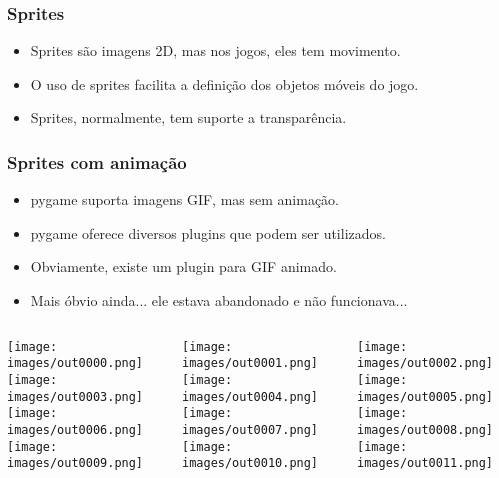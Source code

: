 
\begin{frame}
    \frametitle{Sprites}

    \begin{itemize}
        \item Sprites são imagens 2D, mas nos jogos, eles tem movimento.
        \item O uso de sprites facilita a definição dos objetos móveis
        do jogo.
        \item Sprites, normalmente, tem suporte a transparência.
    \end{itemize}
\end{frame}


\begin{frame}
    \frametitle{Sprites com animação}

    \begin{itemize}
        \item pygame suporta imagens GIF, mas sem animação.
        \item pygame oferece diversos plugins que podem ser utilizados.
        \item Obviamente, existe um plugin para GIF animado.
        \item Mais óbvio ainda... ele estava abandonado e não funcionava...
    \end{itemize}
\end{frame}

\begin{frame}
    \begin{columns}
        \begin{column}{0.3\textwidth}
            \texttt{[image: images/out0000.png]}
            \vfill
            \texttt{[image: images/out0003.png]}
            \vfill
            \texttt{[image: images/out0006.png]}
            \vfill
            \texttt{[image: images/out0009.png]}
        \end{column}
        \begin{column}{0.3\textwidth}
            \texttt{[image: images/out0001.png]}
            \vfill
            \texttt{[image: images/out0004.png]}
            \vfill
            \texttt{[image: images/out0007.png]}
            \vfill
            \texttt{[image: images/out0010.png]}
        \end{column}
        \begin{column}{0.3\textwidth}
            \texttt{[image: images/out0002.png]}
            \vfill
            \texttt{[image: images/out0005.png]}
            \vfill
            \texttt{[image: images/out0008.png]}
            \vfill
            \texttt{[image: images/out0011.png]}
        \end{column}
    \end{columns}
\end{frame}


